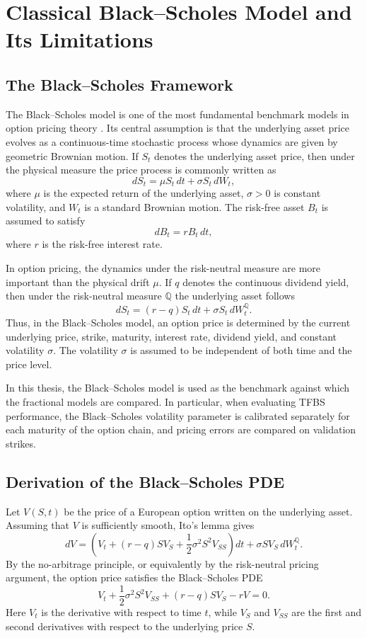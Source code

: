 \documentclass[11pt,a4paper]{report}
\begin{document}
\chapter{Classical Black--Scholes Model and Its Limitations}

\section{The Black--Scholes Framework}

The Black--Scholes model is one of the most fundamental benchmark models in option pricing theory \cite{BlackScholes1973,Merton1973}. Its central assumption is that the underlying asset price evolves as a continuous-time stochastic process whose dynamics are given by geometric Brownian motion. If $S_t$ denotes the underlying asset price, then under the physical measure the price process is commonly written as
\[
dS_t = \mu S_t\,dt + \sigma S_t\,dW_t,
\]
where $\mu$ is the expected return of the underlying asset, $\sigma>0$ is constant volatility, and $W_t$ is a standard Brownian motion. The risk-free asset $B_t$ is assumed to satisfy
\[
dB_t = rB_t\,dt,
\]
where $r$ is the risk-free interest rate.

In option pricing, the dynamics under the risk-neutral measure are more important than the physical drift $\mu$. If $q$ denotes the continuous dividend yield, then under the risk-neutral measure $\mathbb{Q}$ the underlying asset follows
\[
dS_t = (r-q)S_t\,dt + \sigma S_t\,dW_t^{\mathbb{Q}}.
\]
Thus, in the Black--Scholes model, an option price is determined by the current underlying price, strike, maturity, interest rate, dividend yield, and constant volatility $\sigma$. The volatility $\sigma$ is assumed to be independent of both time and the price level.

In this thesis, the Black--Scholes model is used as the benchmark against which the fractional models are compared. In particular, when evaluating TFBS performance, the Black--Scholes volatility parameter is calibrated separately for each maturity of the option chain, and pricing errors are compared on validation strikes.

\section{Derivation of the Black--Scholes PDE}

Let $V(S,t)$ be the price of a European option written on the underlying asset. Assuming that $V$ is sufficiently smooth, Ito's lemma gives
\[
dV
=
\left(
V_t
+
(r-q)S V_S
+
\frac{1}{2}\sigma^2 S^2 V_{SS}
\right)dt
+
\sigma S V_S\,dW_t^{\mathbb{Q}}.
\]
By the no-arbitrage principle, or equivalently by the risk-neutral pricing argument, the option price satisfies the Black--Scholes PDE \cite{BlackScholes1973,Merton1973}
\[
V_t
+
\frac{1}{2}\sigma^2 S^2 V_{SS}
+
(r-q)S V_S
-
rV
=
0.
\]
Here $V_t$ is the derivative with respect to time $t$, while $V_S$ and $V_{SS}$ are the first and second derivatives with respect to the underlying price $S$.
\end{document}
